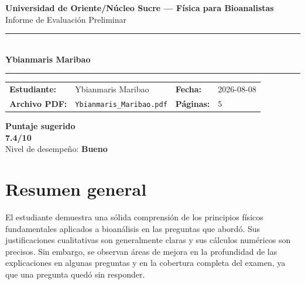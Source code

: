 \documentclass[11pt,a4paper]{article}
\begin{document}
\begin{center}
  {\Large\bfseries\color{azulTitulo} Universidad de Oriente/Núcleo Sucre --- Física para Bioanalistas}\\[4pt]
  {\large Informe de Evaluación Preliminar}\\[12pt]
  \rule{\linewidth}{1.2pt}\\[6pt]
  {\LARGE\bfseries Ybianmaris Maribao}\\[4pt]
  \rule{\linewidth}{0.6pt}
\end{center}

\vspace{4pt}
\begin{tcolorbox}[cajaTitulo, title=Datos del informe]
\begin{tabular}{@{}llll@{}}
  \textbf{Estudiante:}  & Ybianmaris Maribao  &
  \textbf{Fecha:}       & 2026-08-08 \\[4pt]
  \textbf{Archivo PDF:} & \texttt{Ybianmaris\_Maribao.pdf}  &
  \textbf{Páginas:}     & 5 \\
\end{tabular}
\end{tcolorbox}

\vspace{6pt}
\begin{center}
  \begin{tcolorbox}[
    enhanced,
    colback=white, colframe=desempeno_bueno,
    width=0.62\linewidth,
    boxrule=2pt,
    halign=center, valign=center,
    top=8pt, bottom=8pt,
  ]
    \centering
    {\large\bfseries Puntaje sugerido}\\[6pt]
    {\Huge\bfseries\color{desempeno_bueno} 7.4/10}\\[6pt]
    {\large Nivel de desempeño: \textbf{\color{desempeno_bueno} Bueno}}
  \end{tcolorbox}
\end{center}

\section*{Resumen general}
El estudiante demuestra una sólida comprensión de los principios físicos fundamentales aplicados a bioanálisis en las preguntas que abordó. Sus justificaciones cualitativas son generalmente claras y sus cálculos numéricos son precisos. Sin embargo, se observan áreas de mejora en la profundidad de las explicaciones en algunas preguntas y en la cobertura completa del examen, ya que una pregunta quedó sin responder.
\end{document}
